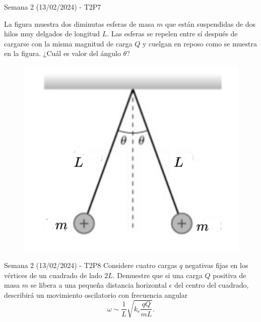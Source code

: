 \begin{frame}{Semana 2 (13/02/2024) - T2P7}
    
    La figura muestra dos diminutas esferas de masa $m$ que est\'an suspendidas de dos hilos muy delgados de longitud $L$. Las esferas se repelen entre sí después de cargarse con la misma magnitud de carga $Q$ y cuelgan en reposo como se muestra en la figura. ¿Cuál es valor del ángulo $\theta$?
    
    \begin{figure}
        \centering
        \includegraphics[scale=0.4]{figures/t2p7.png}
    \end{figure}
    
\end{frame}

\begin{frame}{Semana 2 (13/02/2024) - T2P8}
Considere cuatro cargas $q$ negativas fijas en los vértices de un cuadrado de lado $2L$.
Demuestre que si una carga $Q$ positiva de masa $m$ se libera a una pequeña distancia horizontal $\epsilon$ del centro del cuadrado, describirá un movimiento oscilatorio con frecuencia angular $$\omega\sim\frac{1}{L}\sqrt{k_e\frac{qQ}{mL}}.$$
\end{frame}

